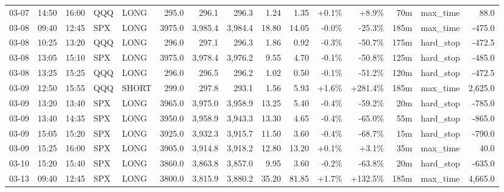 \documentclass[11pt,a4paper,twoside]{article}
\begin{document}
\begin{landscape}
\begin{center}
\begin{longtable}{>{\color{txtmain}}l l l l l r r r r r r r r >{\color{txtmain}}l r}
03-07 & 14:50 & 16:00 & QQQ & LONG & 295.0 & 296.1 & 296.3 & 1.24 & 1.35 & \textcolor{wingreen}{+0.1\%} & \textcolor{wingreen}{+8.9\%} & 70m & max\_time & \textcolor{wingreen}{88.0} \\
03-08 & 09:40 & 12:45 & SPX & LONG & 3975.0 & 3,985.4 & 3,984.4 & 18.80 & 14.05 & \textcolor{lossred}{-0.0\%} & \textcolor{lossred}{-25.3\%} & 185m & max\_time & \textcolor{lossred}{-475.0} \\
03-08 & 10:25 & 13:20 & QQQ & LONG & 296.0 & 297.1 & 296.3 & 1.86 & 0.92 & \textcolor{lossred}{-0.3\%} & \textcolor{lossred}{-50.7\%} & 175m & hard\_stop & \textcolor{lossred}{-472.5} \\
03-08 & 13:05 & 15:10 & SPX & LONG & 3975.0 & 3,978.4 & 3,976.2 & 9.55 & 4.70 & \textcolor{lossred}{-0.1\%} & \textcolor{lossred}{-50.8\%} & 125m & hard\_stop & \textcolor{lossred}{-485.0} \\
03-08 & 13:25 & 15:25 & QQQ & LONG & 296.0 & 296.5 & 296.2 & 1.02 & 0.50 & \textcolor{lossred}{-0.1\%} & \textcolor{lossred}{-51.2\%} & 120m & hard\_stop & \textcolor{lossred}{-472.5} \\
03-09 & 12:50 & 15:55 & QQQ & SHORT & 299.0 & 297.8 & 293.1 & 1.56 & 5.93 & \textcolor{wingreen}{+1.6\%} & \textcolor{wingreen}{+281.4\%} & 185m & max\_time & \textcolor{wingreen}{2,625.0} \\
03-09 & 13:20 & 13:40 & SPX & LONG & 3965.0 & 3,975.0 & 3,958.9 & 13.25 & 5.40 & \textcolor{lossred}{-0.4\%} & \textcolor{lossred}{-59.2\%} & 20m & hard\_stop & \textcolor{lossred}{-785.0} \\
03-09 & 13:40 & 14:35 & SPX & LONG & 3950.0 & 3,958.9 & 3,943.3 & 13.30 & 4.65 & \textcolor{lossred}{-0.4\%} & \textcolor{lossred}{-65.0\%} & 55m & hard\_stop & \textcolor{lossred}{-865.0} \\
03-09 & 15:05 & 15:20 & SPX & LONG & 3925.0 & 3,932.3 & 3,915.7 & 11.50 & 3.60 & \textcolor{lossred}{-0.4\%} & \textcolor{lossred}{-68.7\%} & 15m & hard\_stop & \textcolor{lossred}{-790.0} \\
03-09 & 15:25 & 16:00 & SPX & LONG & 3905.0 & 3,914.8 & 3,918.2 & 12.80 & 13.20 & \textcolor{wingreen}{+0.1\%} & \textcolor{wingreen}{+3.1\%} & 35m & max\_time & \textcolor{wingreen}{40.0} \\
03-10 & 15:20 & 15:40 & SPX & LONG & 3860.0 & 3,863.8 & 3,857.0 & 9.95 & 3.60 & \textcolor{lossred}{-0.2\%} & \textcolor{lossred}{-63.8\%} & 20m & hard\_stop & \textcolor{lossred}{-635.0} \\
03-13 & 09:40 & 12:45 & SPX & LONG & 3800.0 & 3,815.9 & 3,880.2 & 35.20 & 81.85 & \textcolor{wingreen}{+1.7\%} & \textcolor{wingreen}{+132.5\%} & 185m & max\_time & \textcolor{wingreen}{4,665.0} \\

\end{longtable}
\end{center}
\end{landscape}
\end{document}
